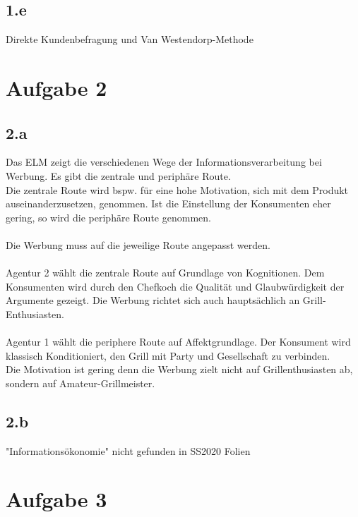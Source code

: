 \subsection{1.e}
    Direkte Kundenbefragung und Van Westendorp-Methode

\section{Aufgabe 2}
\subsection{2.a}
    Das ELM zeigt die verschiedenen Wege der Informationsverarbeitung bei Werbung. Es gibt die zentrale und periphäre Route. \\
    Die zentrale Route wird bspw. für eine hohe Motivation, sich mit dem Produkt auseinanderzusetzen, genommen.
    Ist die Einstellung der Konsumenten eher gering, so wird die periphäre Route genommen. \\
    \ \\
    Die Werbung muss auf die jeweilige Route angepasst werden. \\
    \ \\
    Agentur 2 wählt die zentrale Route auf Grundlage von Kognitionen. Dem Konsumenten wird durch den Chefkoch die Qualität und Glaubwürdigkeit der Argumente gezeigt.
    Die Werbung richtet sich auch hauptsächlich an Grill-Enthusiasten. \\
    \ \\
    Agentur 1 wählt die periphere Route auf Affektgrundlage. Der Konsument wird klassisch Konditioniert, den Grill mit Party und Gesellschaft zu verbinden. \\
    Die Motivation ist gering denn die Werbung zielt nicht auf Grillenthusiasten ab, sondern auf Amateur-Grillmeister.

\subsection{2.b}
    "Informationsökonomie" nicht gefunden in SS2020 Folien

\section{Aufgabe 3}
